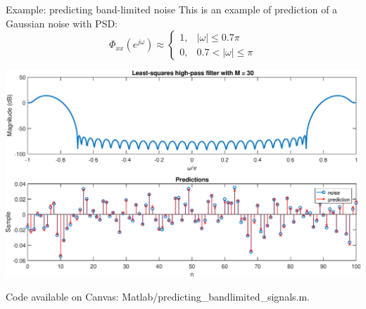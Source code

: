 \documentclass[10pt, handout]{beamer}
\begin{document}
\begin{frame}{Example: predicting band-limited noise}
	This is an example of prediction of a Gaussian noise with PSD:
	\begin{equation*}
	\Phi_{xx}(e^{j\omega}) \approx \begin{cases}
	1, &|\omega|\leq 0.7\pi \\
	0, &0.7 < |\omega| \leq \pi 
	\end{cases}
	\end{equation*}
	\pause
	
	\begin{center}
		\includegraphics[scale=0.35]{figs/predicting_bandlimited_signals_example.eps}
	\end{center}

	Code available on Canvas: Matlab/predicting\_bandlimited\_signals.m.
\end{frame}
\end{document}
